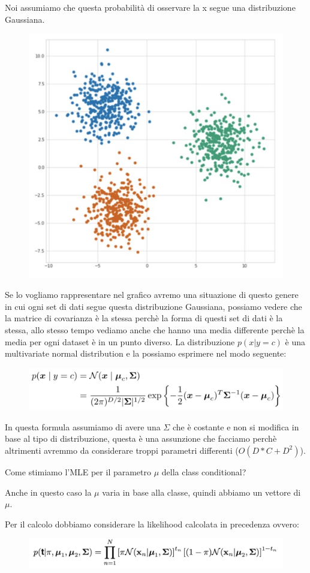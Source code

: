 \documentclass[14pt]{extreport}
\begin{document}
Noi assumiamo che questa probabilità di osservare la x segue una distribuzione Gaussiana.
\begin{figure}[H]
	\centering
	\includegraphics[width=0.3\linewidth]{162.jpeg}
\end{figure}

Se lo vogliamo rappresentare nel grafico avremo una situazione di questo genere in cui ogni set di dati segue questa distribuzione Gaussiana, possiamo
vedere che la matrice di covarianza è la stessa perchè la forma di questi set di dati è la stessa, allo stesso tempo vediamo anche che hanno una media
differente perchè la media per ogni dataset è in un punto diverso. La distribuzione $p(x|y=c)$ è una multivariate normal distribution e la possiamo
esprimere nel modo seguente:

\begin{figure}[H]
	\centering
	\includegraphics[width=0.7\linewidth]{163.jpeg}
\end{figure}

In questa formula assumiamo di avere una $\Sigma$ che è costante e non si modifica in base al tipo di distribuzione, questa è una assunzione che
facciamo perchè altrimenti avremmo da considerare troppi parametri differenti ($O(D*C+D^2)$).

Come stimiamo l'MLE per il parametro $\mu$ della class conditional?

Anche in questo caso la $\mu$ varia in base alla classe, quindi abbiamo un vettore di $\mu$.

Per il calcolo dobbiamo considerare la likelihood calcolata in precedenza ovvero:

\begin{figure}[H]
	\centering
	\includegraphics[width=0.7\linewidth]{204.jpeg}
\end{figure}
\end{document}
